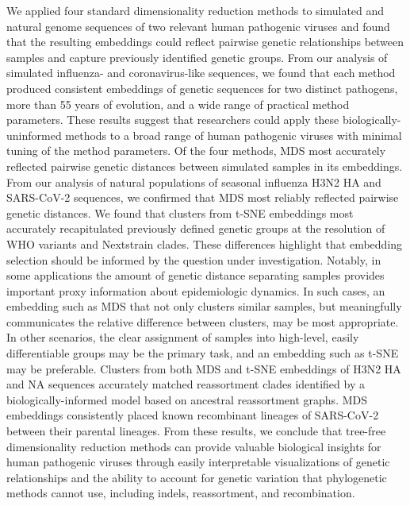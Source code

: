 \documentclass[10pt,letterpaper]{article}
\begin{document}
We applied four standard dimensionality reduction methods to simulated and natural genome sequences of two relevant human pathogenic viruses and found that the resulting embeddings could reflect pairwise genetic relationships between samples and capture previously identified genetic groups.
From our analysis of simulated influenza- and coronavirus-like sequences, we found that each method produced consistent embeddings of genetic sequences for two distinct pathogens, more than 55 years of evolution, and a wide range of practical method parameters.
These results suggest that researchers could apply these biologically-uninformed methods to a broad range of human pathogenic viruses with minimal tuning of the method parameters.
Of the four methods, MDS most accurately reflected pairwise genetic distances between simulated samples in its embeddings.
From our analysis of natural populations of seasonal influenza H3N2 HA and SARS-CoV-2 sequences, we confirmed that MDS most reliably reflected pairwise genetic distances.
We found that clusters from t-SNE embeddings most accurately recapitulated previously defined genetic groups at the resolution of WHO variants and Nextstrain clades.
These differences highlight that embedding selection should be informed by the question under investigation.
Notably, in some applications the amount of genetic distance separating samples provides important proxy information about epidemiologic dynamics.
In such cases, an embedding such as MDS that not only clusters similar samples, but meaningfully communicates the relative difference between clusters, may be most appropriate.
In other scenarios, the clear assignment of samples into high-level, easily differentiable groups may be the primary task, and an embedding such as t-SNE may be preferable.
Clusters from both MDS and t-SNE embeddings of H3N2 HA and NA sequences accurately matched reassortment clades identified by a biologically-informed model based on ancestral reassortment graphs.
MDS embeddings consistently placed known recombinant lineages of SARS-CoV-2 between their parental lineages.
From these results, we conclude that tree-free dimensionality reduction methods can provide valuable biological insights for human pathogenic viruses through easily interpretable visualizations of genetic relationships and the ability to account for genetic variation that phylogenetic methods cannot use, including indels, reassortment, and recombination.
\end{document}
